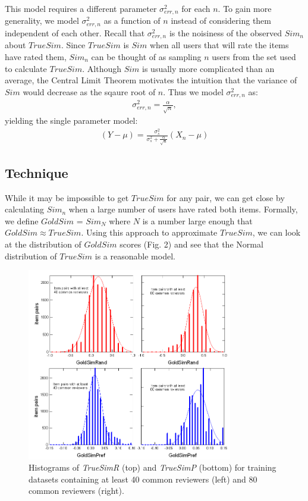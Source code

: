 \documentclass[11pt]{article}
\begin{document}
This model requires a different parameter $\sigma_{err,n}^2$ for each $n$.
To gain more generality, we model $\sigma_{err,n}^2$ as a function of $n$
instead of considering them independent of each other. Recall that 
$\sigma_{err,n}^2$ is the noisiness of the observed $Sim_n$ about $TrueSim$. 
Since $TrueSim$ is $Sim$ when all users that will rate the items 
have rated them, $Sim_n$ can be thought of as sampling $n$ users from the 
set used to calculate $TrueSim$. Although $Sim$ is usually more complicated 
than an average, the Central Limit Theorem motivates the intuition that the 
variance of $Sim$ would decrease as the sqaure root of $n$. Thus we model 
$\sigma_{err,n}^2$ as:
\begin{align}
\sigma_{err,n}^2 = \frac{\alpha}{\sqrt{n}},
\end{align}
yielding the single parameter model:
\begin{align}
\left(Y - \mu\right) = \frac{\sigma_{s}^2}{\sigma_{s}^2+\frac{\alpha}{\sqrt{n}}}
\left(X_n-\mu\right)
\end{align}


\subsection*{Technique}
While it may be impossible to get $TrueSim$ for any pair, we
can get close by calculating $Sim_n$ when a large number of users have rated
both items. Formally, we define $GoldSim$ = $Sim_N$ where $N$ is a number 
large enough that $GoldSim \approx TrueSim$. Using this approach to approximate
$TrueSim$, we can look at the distribution of $GoldSim$ scores (Fig. 2) and see 
that the Normal distribution of $TrueSim$ is a reasonable model.

\begin{figure}[!htbp]
    \centering
    \includegraphics[width=0.8\textwidth]{Histograms.png}
	\caption{Histograms of {\em TrueSimR} (top) and {\em TrueSimP} (bottom) for
training datasets containing at least 40 common reviewers (left) and 80 common
reviewers (right).}
    \label{fig:Histograms}
\end{figure}
\end{document}
